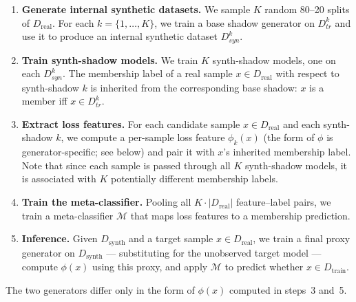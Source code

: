\documentclass[11pt]{article}
\newcommand{\sikha}[1]{\textcolor{blue}{Sikha: #1}}
\newcommand{\emma}[1]{\textcolor{orange}{Emma: #1}}
\newcommand{\steven}[1]{\textcolor{Periwinkle}{Steven: #1}}
\begin{document}
\begin{enumerate}[leftmargin=*, noitemsep, topsep=0pt]
\item \textbf{Generate internal synthetic datasets.} We sample $K$ random 80--20 splits of $D_{\text{real}}$. For each $k = \{1, \ldots, K\}$, we train a base shadow generator on $D_{tr}^k$ and use it to produce an internal synthetic dataset $D_{syn}^k$.
\item \textbf{Train synth-shadow models.} We train $K$ synth-shadow models, one on each $D_{syn}^k$. The membership label of a real sample $x \in D_{\text{real}}$ with respect to synth-shadow $k$ is inherited from the corresponding base shadow: $x$ is a member iff $x \in D_{tr}^k$.
\item \textbf{Extract loss features.} For each candidate sample $x \in D_{\text{real}}$ and each synth-shadow $k$, we compute a per-sample loss feature $\phi_k(x)$ (the form of $\phi$ is generator-specific; see below) and pair it with $x$'s inherited membership label. Note that since each sample is passed through all $K$ synth-shadow models, it is associated with $K$ potentially different membership labels.
\item \textbf{Train the meta-classifier.} Pooling all $K \cdot |D_{\text{real}}|$ feature--label pairs, we train a meta-classifier $\mathcal{M}$ that maps loss features to a membership prediction.
\item \textbf{Inference.} Given $D_{\text{synth}}$ and a target sample $x \in D_{\text{real}}$, we train a final proxy generator on $D_{\text{synth}}$ --- substituting for the unobserved target model --- compute $\phi(x)$ using this proxy, and apply $\mathcal{M}$ to predict whether $x \in D_{\text{train}}$.
\end{enumerate}
The two generators differ only in the form of $\phi(x)$ computed in steps~3 and~5.



\end{document}
